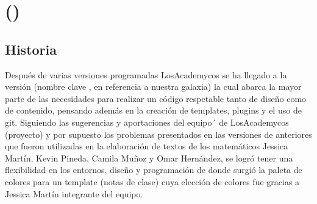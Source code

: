 {\justifying
\chapter[\printkeyname]{\printproject\space(\printkeyname)}
	\section{Historia}
	Después de varias versiones programadas LosAcademycos se ha llegado a la versión \printproject\space (nombre clave \printkeyname, en referencia a nuestra galaxia) la cual abarca la mayor parte de las necesidades para realizar un código respetable tanto de diseño como de contenido, pensando además en la creación de templates, plugins y el uso de git. 
	\pap 
	Siguiendo las sugerencias y aportaciones del equipo´ de LosAcademycos (proyecto) y por supuesto los problemas presentados en las versiones de anteriores que fueron utilizadas en la elaboración de textos de los matemáticos Jessica Martín, Kevin Pineda, Camila Muñoz y Omar Hernández, se logró tener una flexibilidad en los entornos, diseño y programación de donde surgió la paleta de colores para un template (notas de clase) cuya elección de colores fue gracias a Jessica Martín integrante del equipo. 
	\pap 
}
